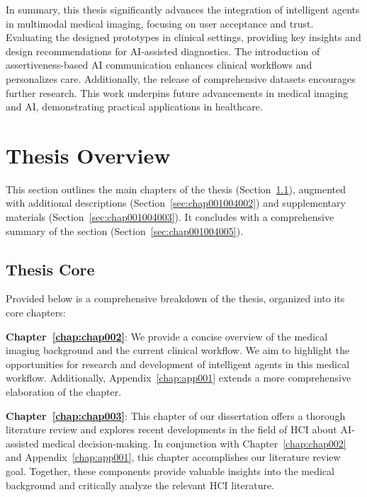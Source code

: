 \vspace{2.00mm}

\textcolor{revised}{In summary, this thesis significantly advances the integration of intelligent agents in multimodal medical imaging, focusing on user acceptance and trust.
Evaluating the designed prototypes in clinical settings, providing key insights and design recommendations for \ac{AI}-assisted diagnostics.
The introduction of assertiveness-based \ac{AI} communication enhances clinical workflows and personalizes care.
Additionally, the release of comprehensive datasets encourages further research.
This work underpins future advancements in medical imaging and \ac{AI}, demonstrating practical applications in healthcare.}

\section{\textcolor{revised}{Thesis Overview}}
\label{sec:chap001004}

This section outlines the main chapters of the thesis (Section~\ref{sec:chap001004001}), augmented with additional descriptions (Section~\ref{sec:chap001004002}) and supplementary materials (Section~\ref{sec:chap001004003}).
It concludes with a comprehensive summary of the section (Section~\ref{sec:chap001004005}).

\subsection{Thesis Core}
\label{sec:chap001004001}

Provided below is a comprehensive breakdown of the thesis, organized into its core chapters:

\vspace{2.00mm}

\noindent
{\bf Chapter~\ref{chap:chap002}}:
We provide a concise overview of the medical imaging background and the current clinical workflow.
We aim to highlight the opportunities for research and development of intelligent agents in this medical workflow.
Additionally, Appendix~\ref{chap:app001} extends a more comprehensive elaboration of the chapter.

\vspace{2.00mm}

\noindent
{\bf Chapter~\ref{chap:chap003}}:
This chapter of our dissertation offers a thorough literature review and explores recent developments in the field of \ac{HCI} about \ac{AI}-assisted medical decision-making.
In conjunction with Chapter~\ref{chap:chap002} and Appendix~\ref{chap:app001}, this chapter accomplishes our literature review goal.
Together, these components provide valuable insights into the medical background and critically analyze the relevant \ac{HCI} literature.

